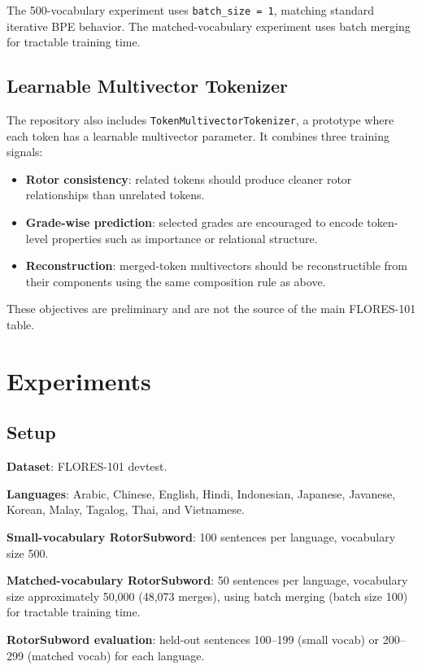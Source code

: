 \documentclass[11pt]{article}
\begin{document}
The 500-vocabulary experiment uses \texttt{batch\_size = 1}, matching standard iterative BPE behavior. The matched-vocabulary experiment uses batch merging for tractable training time.

\subsection{Learnable Multivector Tokenizer}

The repository also includes \texttt{TokenMultivectorTokenizer}, a prototype where each token has a learnable multivector parameter. It combines three training signals:
\begin{itemize}
  \item \textbf{Rotor consistency}: related tokens should produce cleaner rotor relationships than unrelated tokens.
  \item \textbf{Grade-wise prediction}: selected grades are encouraged to encode token-level properties such as importance or relational structure.
  \item \textbf{Reconstruction}: merged-token multivectors should be reconstructible from their components using the same composition rule as above.
\end{itemize}

These objectives are preliminary and are not the source of the main FLORES-101 table.

\section{Experiments}

\subsection{Setup}

\textbf{Dataset}: FLORES-101 devtest.

\textbf{Languages}: Arabic, Chinese, English, Hindi, Indonesian, Japanese, Javanese, Korean, Malay, Tagalog, Thai, and Vietnamese.

\textbf{Small-vocabulary RotorSubword}: 100 sentences per language, vocabulary size 500.

\textbf{Matched-vocabulary RotorSubword}: 50 sentences per language, vocabulary size approximately 50,000 (48,073 merges), using batch merging (batch size 100) for tractable training time.

\textbf{RotorSubword evaluation}: held-out sentences 100--199 (small vocab) or 200--299 (matched vocab) for each language.
\end{document}

